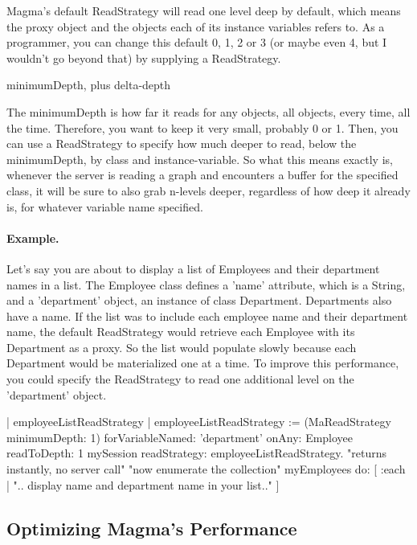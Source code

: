 \documentclass[a4paper,10pt,twoside]{book}
\begin{document}
Magma's default ReadStrategy will read one level deep by default, which means the proxy object and the objects each of its instance variables refers to. As a programmer, you can change this default 0, 1, 2 or 3 (or maybe even 4, but I wouldn't go beyond that) by supplying a ReadStrategy.

minimumDepth, plus delta-depth

The minimumDepth is how far it reads for any objects, all objects, every time, all the time. Therefore, you want to keep it very small, probably 0 or 1. Then, you can use a ReadStrategy to specify how much deeper to read, below the minimumDepth, by class and instance-variable. So what this means exactly is, whenever the server is reading a graph and encounters a buffer for the specified class, it will be sure to also grab n-levels deeper, regardless of how deep it already is, for whatever variable name specified. 

\paragraph{Example.}
Let's say you are about to display a list of Employees and their department names in a list. The Employee class defines a 'name' attribute, which is a String, and a 'department' object, an instance of class Department. Departments also have a name. If the list was to include each employee name and their department name, the default ReadStrategy would retrieve each Employee with its Department as a proxy. So the list would populate slowly because each Department would be materialized one at a time. To improve this performance, you could specify the ReadStrategy to read one additional level on the 'department' object.

\begin{code}{}
	| employeeListReadStrategy |
	employeeListReadStrategy :=
		(MaReadStrategy minimumDepth: 1)
			forVariableNamed: 'department'
			onAny: Employee
			readToDepth: 1
	mySession readStrategy: employeeListReadStrategy. "returns instantly, no server call"
	"now enumerate the collection"
	myEmployees do: [ :each | ".. display name and department name in your list.." ]
\end{code}



\subsection{Optimizing Magma's Performance}
\end{document}
